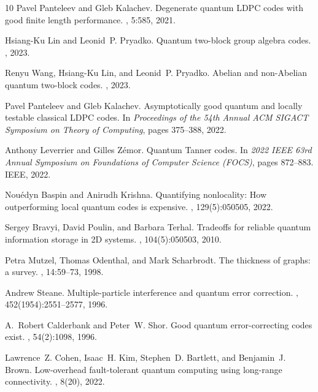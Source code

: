 \documentclass{article}
\begin{document}
\begin{thebibliography}{10}
	Pavel Panteleev and Gleb Kalachev.
	\newblock Degenerate quantum {LDPC} codes with good finite length performance.
	, 5:585, 2021.
	
	Hsiang-Ku Lin and Leonid~P. Pryadko.
	\newblock Quantum two-block group algebra codes.
	, 2023.
	
	Renyu Wang, Hsiang-Ku Lin, and Leonid~P. Pryadko.
	\newblock Abelian and non-{A}belian quantum two-block codes.
	, 2023.
	
	Pavel Panteleev and Gleb Kalachev.
	\newblock Asymptotically good quantum and locally testable classical {LDPC}
	codes.
	\newblock In {\em Proceedings of the 54th Annual ACM SIGACT Symposium on Theory
		of Computing}, pages 375--388, 2022.
	
	Anthony Leverrier and Gilles Z{\'e}mor.
	\newblock Quantum {T}anner codes.
	\newblock In {\em 2022 IEEE 63rd Annual Symposium on Foundations of Computer
		Science (FOCS)}, pages 872--883. IEEE, 2022.
	
	Nou{\'e}dyn Baspin and Anirudh Krishna.
	\newblock Quantifying nonlocality: How outperforming local quantum codes is
	expensive.
	, 129(5):050505, 2022.
	
	Sergey Bravyi, David Poulin, and Barbara Terhal.
	\newblock Tradeoffs for reliable quantum information storage in {2D} systems.
	, 104(5):050503, 2010.
	
	Petra Mutzel, Thomas Odenthal, and Mark Scharbrodt.
	\newblock The thickness of graphs: a survey.
	, 14:59--73, 1998.
	
	Andrew Steane.
	\newblock Multiple-particle interference and quantum error correction.
	, 452(1954):2551--2577, 1996.
	
	A.~Robert Calderbank and Peter~W. Shor.
	\newblock Good quantum error-correcting codes exist.
	, 54(2):1098, 1996.
	
	Lawrence~Z. Cohen, Isaac~H. Kim, Stephen~D. Bartlett, and Benjamin~J. Brown.
	\newblock Low-overhead fault-tolerant quantum computing using long-range
	connectivity.
	, 8(20), 2022.
	

\end{thebibliography}
\end{document}
